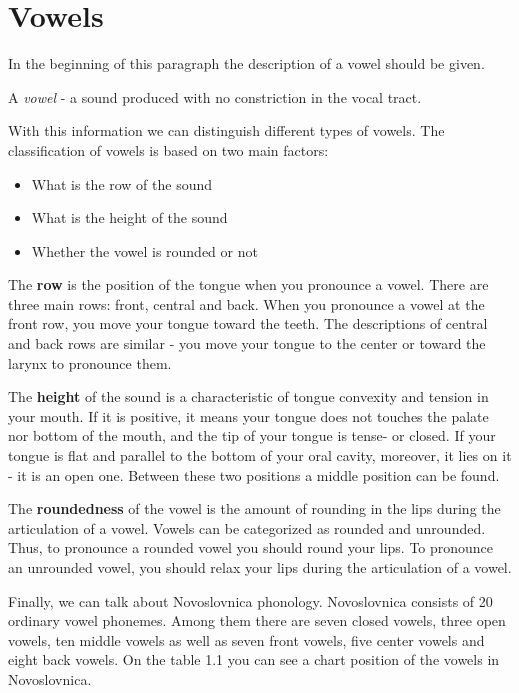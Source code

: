 \section{Vowels}

In the beginning of this paragraph the description of a vowel should be given.

A \textit{vowel} - a sound produced with no constriction in the vocal tract.

With this information we can distinguish different types of vowels. The classification of vowels is based on two main factors:

\begin{itemize}
	\item{What is the row of the sound}
	\item{What is the height of the sound}
	\item{Whether the vowel is rounded or not}
\end{itemize}

The \textbf{row} is the position of the tongue when you pronounce a vowel. There are three main rows: front, central and back. When you pronounce a vowel at the front row, you move your tongue toward the teeth. The descriptions of central and back rows are similar - you move your tongue to the center or toward the larynx to pronounce them.

The \textbf{height} of the sound is a characteristic of tongue convexity and tension in your mouth. If it is positive, it means your tongue does not touches the palate nor bottom of the mouth, and the tip of your tongue is tense- or closed. If your tongue is flat and parallel to the bottom of your oral cavity, moreover, it lies on it - it is an open one. Between these two positions a middle position can be found.

The \textbf{roundedness} of the vowel is the amount of rounding in the lips during the articulation of a vowel. Vowels can be categorized as rounded and unrounded. Thus, to pronounce a rounded vowel you should round your lips. To pronounce an unrounded vowel, you should relax your lips during the articulation of a vowel.

Finally, we can talk about Novoslovnica phonology. Novoslovnica consists of 20 ordinary vowel phonemes. Among them there are seven closed vowels, three open vowels, ten middle vowels as well as seven front vowels, five center vowels and eight back vowels. On the table 1.1 you can see a chart position of the vowels in Novoslovnica.

